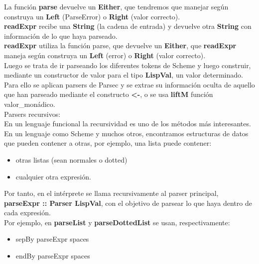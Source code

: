 La funci\'on \textbf{parse} devuelve un \textbf{Either}, que tendremos que manejar seg\'un construya un \textbf{Left} (ParseError) o \textbf{Right} (valor correcto).\\

\textbf{readExpr} recibe una \textbf{String} (la cadena de entrada) y devuelve otra \textbf{String} con informaci\'on de lo que haya parseado.\\

\textbf{readExpr} utiliza la funci\'on parse, que devuelve un \textbf{Either}, que \textbf{readExpr} maneja seg\'un construya un \textbf{Left} (error) o \textbf{Right} (valor correcto).\\

Luego se trata de ir parseando los diferentes tokens de Scheme y luego construir, mediante un constructor de valor para el tipo \textbf{LispVal}, un valor determinado.\\

Para ello se aplican parsers de Parsec y se extrae su informaci\'on oculta de aquello que han parseado mediante el constructo \textbf{<-}, o se usa \textbf{liftM} funci\'on valor\_mon\'adico.\\

Parsers recursivos:\\

En un lenguaje funcional la recursividad es uno de los m\'etodos m\'as interesantes. En un lenguaje como Scheme y muchos otros, encontramos estructuras de datos que pueden contener a otras, por ejemplo, una lista puede contener:\\

\begin{itemize}
  \item otras listas (sean normales o dotted)
  \item cualquier otra expresi\'on.
\end{itemize}

Por tanto, en el int\'erprete se llama recursivamente al parser principal, \textbf{parseExpr :: Parser LispVal}, con el objetivo de parsear lo que haya dentro de cada expresi\'on.\\

Por ejemplo, en \textbf{parseList} y \textbf{parseDottedList} se usan, respectivamente:\\

\begin{itemize}
  \item sepBy parseExpr spaces
  \item endBy parseExpr spaces
\end{itemize}

